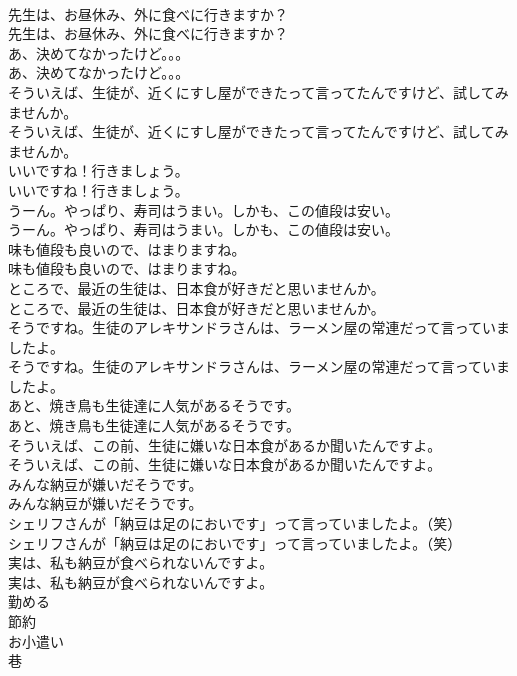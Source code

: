 \documentclass[8pt]{extreport}
\begin{document}
\begin{CJK}{UTF8}{min}
\\	先生は、お昼休み、外に食べに行きますか？	
\\	先生は、お昼休み、外に食べに行きますか？ 
\\	あ、決めてなかったけど。。。	
\\	あ、決めてなかったけど。。。 
\\	そういえば、生徒が、近くにすし屋ができたって言ってたんですけど、試してみませんか。	
\\	そういえば、生徒が、近くにすし屋ができたって言ってたんですけど、試してみませんか。 
\\	いいですね！行きましょう。	
\\	いいですね！行きましょう。 
\\	うーん。やっぱり、寿司はうまい。しかも、この値段は安い。	
\\	うーん。やっぱり、寿司はうまい。しかも、この値段は安い。 
\\	味も値段も良いので、はまりますね。	
\\	味も値段も良いので、はまりますね。 
\\	ところで、最近の生徒は、日本食が好きだと思いませんか。	
\\	ところで、最近の生徒は、日本食が好きだと思いませんか。 
\\	そうですね。生徒のアレキサンドラさんは、ラーメン屋の常連だって言っていましたよ。	
\\	そうですね。生徒のアレキサンドラさんは、ラーメン屋の常連だって言っていましたよ。 
\\	あと、焼き鳥も生徒達に人気があるそうです。	
\\	あと、焼き鳥も生徒達に人気があるそうです。 
\\	そういえば、この前、生徒に嫌いな日本食があるか聞いたんですよ。	
\\	そういえば、この前、生徒に嫌いな日本食があるか聞いたんですよ。 
\\	みんな納豆が嫌いだそうです。	
\\	みんな納豆が嫌いだそうです。 
\\	シェリフさんが「納豆は足のにおいです」って言っていましたよ。（笑）	
\\	シェリフさんが「納豆は足のにおいです」って言っていましたよ。（笑） 
\\	実は、私も納豆が食べられないんですよ。	
\\	実は、私も納豆が食べられないんですよ。 
\\	勤める
\\	節約
\\	お小遣い
\\	巷

\end{CJK}
\end{document}
